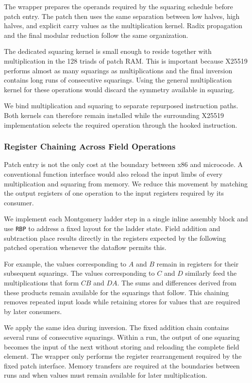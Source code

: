 \documentclass[journal=tches,submission]{iacrtrans}
\newcommand{\code}[1]{\texttt{#1}}
\begin{document}
The wrapper prepares the operands required by the squaring schedule before patch entry.
The patch then uses the same separation between low halves, high halves, and explicit carry values as the multiplication kernel.
Radix propagation and the final modular reduction follow the same organization.

The dedicated squaring kernel is small enough to reside together with multiplication in the 128 triads of patch RAM.
This is important because X25519 performs almost as many squarings as multiplications and the final inversion contains long runs of consecutive squarings.
Using the general multiplication kernel for these operations would discard the symmetry available in squaring.

We bind multiplication and squaring to separate repurposed instruction paths.
Both kernels can therefore remain installed while the surrounding X25519 implementation selects the required operation through the hooked instruction.

\subsubsection{Register Chaining Across Field Operations}
\label{sec}

Patch entry is not the only cost at the boundary between x86 and microcode.
A conventional function interface would also reload the input limbs of every multiplication and squaring from memory.
We reduce this movement by matching the output registers of one operation to the input registers required by its consumer.

We implement each Montgomery ladder step in a single inline assembly block and use \code{RBP} to address a fixed layout for the ladder state.
Field addition and subtraction place results directly in the registers expected by the following patched operation whenever the dataflow permits this.

For example, the values corresponding to $A$ and $B$ remain in registers for their subsequent squarings.
The values corresponding to $C$ and $D$ similarly feed the multiplications that form $CB$ and $DA$.
The sums and differences derived from these products remain available for the squarings that follow.
This chaining removes repeated input loads while retaining stores for values that are required by later consumers.

We apply the same idea during inversion.
The fixed addition chain contains several runs of consecutive squarings.
Within a run, the output of one squaring becomes the input of the next without storing and reloading the complete field element.
The wrapper only performs the register rearrangement required by the fixed patch interface.
Memory transfers are required at the boundaries between runs and when values must remain available for later multiplication.
\end{document}
